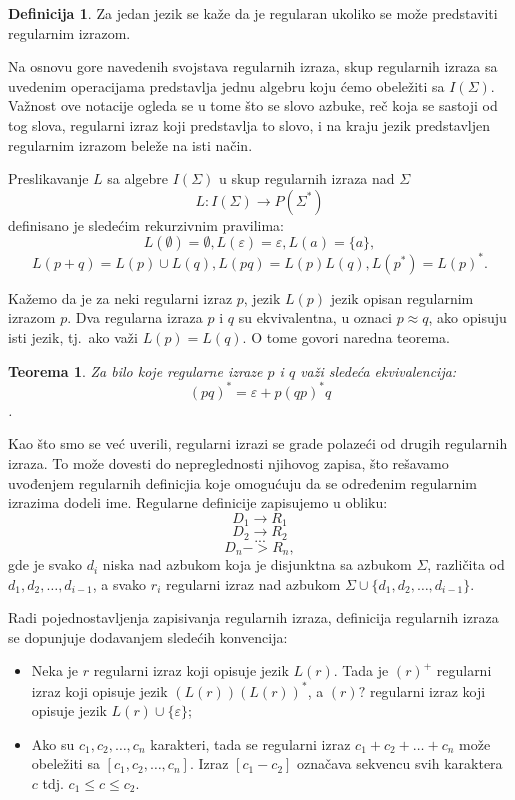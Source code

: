 \documentclass[12pt,oneside]{memoir}
\theoremstyle{plain}
\newtheorem{thm}{Teorema}[chapter] %
\theoremstyle{definition}
\newtheorem{defn}{Definicija} %
\begin{document}
\begin{defn}
Za jedan jezik se kaže da je regularan ukoliko se može predstaviti regularnim izrazom. 
\end{defn}

Na osnovu gore navedenih svojstava regularnih izraza, skup regularnih izraza sa uvedenim operacijama predstavlja jednu algebru koju ćemo obeležiti sa $I(\Sigma)$. Važnost ove notacije ogleda se u tome što se slovo azbuke, reč koja se sastoji od tog slova, regularni izraz koji predstavlja to slovo, i na kraju jezik predstavljen regularnim izrazom beleže na isti način. 

Preslikavanje $L$ sa algebre $I(\Sigma)$ u skup regularnih izraza nad $\Sigma$ $$ L : I(\Sigma) \rightarrow P(\Sigma^*)$$ definisano je sledećim rekurzivnim pravilima:
$$ L(\emptyset) = \emptyset, L(\varepsilon) = \varepsilon, L(a) = \{a\},$$
$$ L(p+q) = L(p) \cup L(q), L(pq) = L(p)L(q), L(p^*) = L(p)^*.$$

Kažemo da je za neki regularni izraz $p$, jezik $L(p)$ jezik opisan regularnim izrazom $p$. Dva regularna izraza $p$ i $q$ su ekvivalentna, u oznaci $p \approx q$, ako opisuju isti jezik, tj.~ako važi $L(p) = L(q)$. O tome govori naredna teorema.

\begin{thm}
Za bilo koje regularne izraze $p$ i $q$ važi sledeća ekvivalencija: $$(pq)^* = \varepsilon + p(qp)^* q$$.
\end{thm}

Kao što smo se već uverili, regularni izrazi se grade polazeći od drugih regularnih izraza. To može dovesti do nepreglednosti njihovog zapisa, što rešavamo uvođenjem regularnih definicjia koje omogućuju da se određenim regularnim izrazima dodeli ime. Regularne definicije zapisujemo u obliku:
$$D_1  \rightarrow R_1$$
$$D_2  \rightarrow R_2$$
$$ ... $$
$$D_n -> R_n, $$
gde je svako $d_i$ niska nad azbukom koja je disjunktna sa azbukom $\Sigma$, različita od $d_1, d_2, …, d_{i-1}$, a svako $r_i$ regularni izraz nad azbukom $\Sigma \cup \{ d_1, d_2, …, d_{i-1}\}$.

Radi pojednostavljenja zapisivanja regularnih izraza, definicija regularnih izraza se dopunjuje dodavanjem sledećih konvencija:
\begin{itemize}
\item Neka je $r$ regularni izraz koji opisuje jezik $L(r)$. Tada je $(r)^+$ regularni izraz koji opisuje jezik $(L(r))(L(r))^*$, a $(r)?$ regularni izraz koji opisuje jezik $L(r) \cup \{\varepsilon\}$;
\item Ako su $c_1, c_2, …, c_n$ karakteri, tada se regularni izraz $c_1 + c_2 + … + c_n$ može obeležiti sa $[c_1, c_2, …, c_n]$. Izraz $[c_1-c_2]$ označava sekvencu svih karaktera $c$ tdj. $c_1 \leq c \leq c_2$.
\end{itemize}
\end{document}
